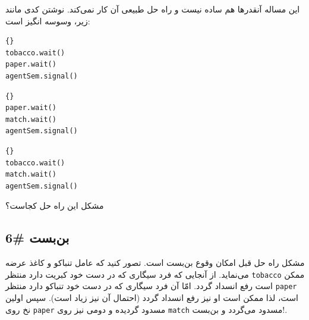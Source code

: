 \documentclass{book}
\newcommand{\clearemptydoublepage}{\newpage\cleardoublepage}
\begin{document}
    این مساله آنقدرها هم ساده نیست و راه حل طبیعی آن کار نمی‌کند. نوشتن کدی مانند زیر، وسوسه انگیز است: 
    

\begin{latin}
\begin{latin}
\begin{lstlisting}[title={سیگاری با کبریت}]{}
tobacco.wait()
paper.wait()
agentSem.signal()
\end{lstlisting}
\end{latin}

\begin{latin}
\begin{lstlisting}[title={سیگاری با تنباکو}]{}
paper.wait()
match.wait()
agentSem.signal()
\end{lstlisting}
\end{latin}

\begin{latin}
\begin{lstlisting}[title={سیگاری با کاغذ}]{}
tobacco.wait()
match.wait()
agentSem.signal()
\end{lstlisting}
\end{latin}
\end{latin}

    مشکل این  راه حل کجاست؟

\clearemptydoublepage
\subsection{بن‌بست \#6}

    مشکل راه حل قبل امکان وقوع بن‌بست است. تصور کنید که عامل تنباکو و کاغذ عرضه می‌نماید. از آنجایی که فرد  سیگاری‌ که در دست خود کبریت دارد 
    منتظر {\tt tobacco} ممکن است رفع انسداد گردد. امّا آن فرد سیگاری که در دست خود تنباکو دارد منتظر {\tt paper} است، لذا ممکن است او نیز 
    رفع انسداد گردد (احتمال آن نیز زیاد است). سپس اولین نخ روی {\tt paper} مسدود گردیده و دومی نیز روی {\tt match} مسدود می‌گردد و بن‌بست!. 
\end{document}
